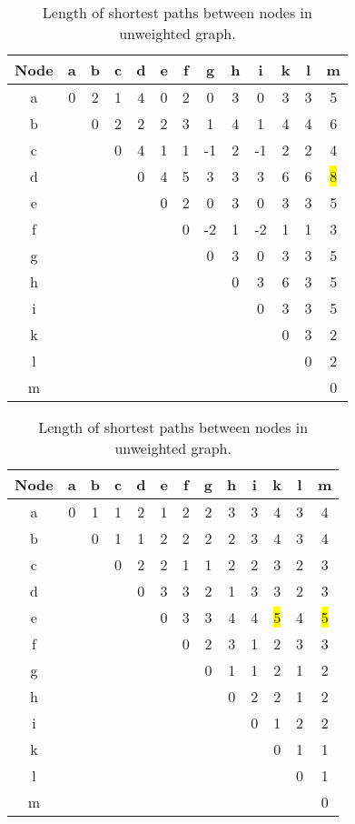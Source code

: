 \documentclass[a4paper,onecolumn,oneside]{article}
\begin{document}
\begin{table}[h]
\begin{subtable}
\centering
\begin{tabular}{c || c c c c c c c c c c c c}
Node & a& b& c& d& e& f& g& h& i& k& l& m\\
\hline \hline
a& 0& 2& 1& 4& 0& 2& 0& 3& 0& 3& 3& 5\\
b&  & 0& 2& 2& 2& 3& 1& 4& 1& 4& 4& 6\\
c&  &  & 0& 4& 1& 1&-1& 2&-1& 2& 2& 4\\
d&  &  &  & 0& 4& 5& 3& 3& 3& 6& 6& \colorbox{yellow}{8}\\
e&  &  &  &  & 0& 2& 0& 3& 0& 3& 3& 5\\
f&  &  &  &  &  & 0&-2& 1&-2& 1& 1& 3\\
g&  &  &  &  &  &  & 0& 3& 0& 3& 3& 5\\
h&  &  &  &  &  &  &  & 0& 3& 6& 3& 5\\
i&  &  &  &  &  &  &  &  & 0& 3& 3& 5\\
k&  &  &  &  &  &  &  &  &  & 0& 3& 2\\
l&  &  &  &  &  &  &  &  &  &  & 0& 2\\
m&  &  &  &  &  &  &  &  &  &  &  & 0\\
\end{tabular}
\caption{Length of shortest paths between nodes in weighted graph.}
\label{tbl:weighted-paths}
\end{subtable}
\qquad

\begin{subtable}
\centering
\begin{tabular}{c || c c c c c c c c c c c c}
Node & a& b& c& d& e& f& g& h& i& k& l& m\\
\hline \hline
a& 0& 1& 1& 2& 1& 2& 2& 3& 3& 4& 3& 4\\
b&  & 0& 1& 1& 2& 2& 2& 2& 3& 4& 3& 4\\
c&  &  & 0& 2& 2& 1& 1& 2& 2& 3& 2& 3\\
d&  &  &  & 0& 3& 3& 2& 1& 3& 3& 2& 3\\
e&  &  &  &  & 0& 3& 3& 4& 4& \colorbox{yellow}{5}& 4& \colorbox{yellow}{5}\\
f&  &  &  &  &  & 0& 2& 3& 1& 2& 3& 3\\
g&  &  &  &  &  &  & 0& 1& 1& 2& 1& 2\\
h&  &  &  &  &  &  &  & 0& 2& 2& 1& 2\\
i&  &  &  &  &  &  &  &  & 0& 1& 2& 2\\
k&  &  &  &  &  &  &  &  &  & 0& 1& 1\\
l&  &  &  &  &  &  &  &  &  &  & 0& 1\\
m&  &  &  &  &  &  &  &  &  &  &  & 0\\
\end{tabular}
\caption{Length of shortest paths between nodes in unweighted graph.}
\label{tbl:unweighted-paths}
\end{subtable}
\end{table}
\end{document}
